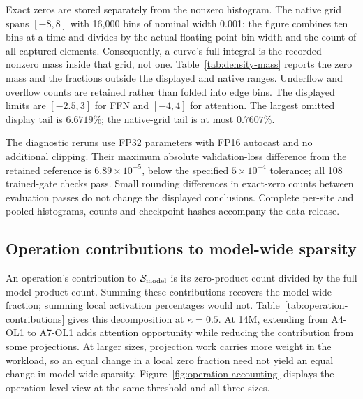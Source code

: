 Exact zeros are stored separately from the nonzero histogram. The native
grid spans $[-8,8]$ with 16,000 bins of nominal width 0.001; the figure
combines ten bins at a time and divides by the actual floating-point bin
width and the count of all captured elements. Consequently, a curve's full
integral is the recorded nonzero mass inside that grid, not one. Table~\ref{tab:density-mass}
reports the zero mass and the fractions outside the displayed and native
ranges. Underflow and overflow counts are retained rather than folded into
edge bins. The displayed limits are $[-2.5,3]$ for FFN and $[-4,4]$ for
attention. The largest omitted display tail is $6.6719\%$; the native-grid
tail is at most $0.7607\%$.

The diagnostic reruns use FP32 parameters with FP16 autocast and no
additional clipping. Their maximum absolute validation-loss difference
from the retained reference is $6.89\times10^{-5}$, below the specified
$5\times10^{-4}$ tolerance; all 108 trained-gate checks pass. Small
rounding differences in exact-zero counts between evaluation passes do not
change the displayed conclusions. Complete per-site and pooled histograms,
counts and checkpoint hashes accompany the data release.

\begin{table}[htbp]
\centering\small
\caption{Zero mass omitted from the density curves, and mass outside their
displayed range (view tail) and the native $[-8,8]$ histogram (grid tail).
All percentages divide integer counts by all captured elements. A0 is
listed once although it is repeated in each figure row. These 14 groups
come from seven checkpoints.}
\label{tab:density-mass}

\end{table}

\FloatBarrier
\subsection{Operation contributions to model-wide sparsity}
\label{app:operation-results}

An operation's contribution to $\mathcal{S}_{\mathrm{model}}$ is its zero-product count divided
by the full model product count. Summing these contributions recovers the
model-wide fraction; summing local activation percentages would not.
Table~\ref{tab:operation-contributions} gives this decomposition at
$\kappa=0.5$. At 14M, extending from A4-OL1 to A7-OL1 adds attention
opportunity while reducing the contribution from some projections.
At larger sizes, projection work carries more weight in the workload, so
an equal change in a local zero fraction need not yield an equal change in
model-wide sparsity. Figure~\ref{fig:operation-accounting} displays the
operation-level view at the same threshold and all three sizes.


